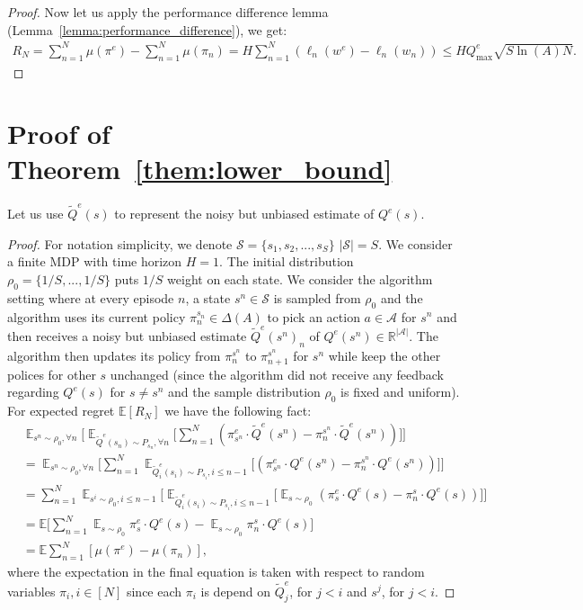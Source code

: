 \documentclass{article}
\begin{document}
\begin{proof}
Now let us apply the performance difference lemma (Lemma~\ref{lemma:performance_difference}), we get:
\begin{align}
R_N = \sum_{n=1}^N\mu(\pi^e) - \sum_{n=1}^N\mu(\pi_n) = H\sum_{n=1}^N (\ell_n(w^e) - \ell_n(w_n)) \leq HQ_{\max}^e\sqrt{S\ln(A)N}.
\end{align}

\end{proof}


\section{Proof of Theorem~\ref{them:lower_bound}}
\label{sec:proof_lower_bound}
Let us use $\tilde{Q}^e(s)$ to represent the noisy but unbiased estimate of $Q^e(s)$.
\begin{proof}
For notation simplicity, we denote $\mathcal{S} = \{s_1, s_2, ..., s_S\}$ $|\mathcal{S}|= S$. We consider a finite MDP with time horizon $H = 1$. The initial distribution $\rho_0 = \{1/S, ..., 1/S\}$ puts $1/S$ weight on each state. 
We consider the algorithm setting where at every episode $n$, a state $s^n\in \mathcal{S}$ is sampled from $\rho_0$ and the algorithm uses its current policy $\pi_{n}^{s_n}\in\Delta({A})$ to pick an action $a\in\mathcal{A}$ for $s^n$ and then receives a noisy but unbiased estimate $\tilde{Q}^e(s^n)_n$ of $Q^e(s^n)\in\mathbb{R}^{|\mathcal{A}|}$. The algorithm then updates its policy from $\pi_{n}^{s^n}$ to $\pi_{n+1}^{s^n}$ for $s^n$ while keep the other polices for other $s$ unchanged (since the algorithm did not receive any feedback regarding $Q^e(s)$ for $s\neq s^{n}$ and the sample distribution $\rho_0$ is fixed and uniform). For expected regret $\mathbb{E}[R_N]$ we have the following fact:
\begin{align}
\label{eq:relation}
&\mathop{\mathbb{E}}_{s^n\sim\rho_0,\forall n}\Big[\mathop{\mathbb{E}}_{\tilde{Q}^e(s_n)\sim P_{s_n},\forall n}\big[\sum_{n=1}^N( \pi^e_{s^n} \cdot \tilde{Q}^e(s^n) - \pi_n^{s^n}\cdot \tilde{Q}^e(s^n))\big]\Big] \nonumber\\
&= \mathop{\mathbb{E}}_{s^n\sim \rho_0,\forall n}\Big[\sum_{n=1}^N\mathop{\mathbb{E}}_{\tilde{Q}^e_i(s_i)\sim P_{s_i},i\leq n-1}\big[ (\pi_{s^n}^e\cdot Q^e(s^n) - \pi_n^{s^n}\cdot Q^e(s^n))\big]\Big] \nonumber\\
& = \sum_{n=1}^N\mathop{\mathbb{E}}_{s^i\sim \rho_0,i\leq n-1}\Big[\mathop{\mathbb{E}}_{\tilde{Q}^e_i(s_i)\sim P_{s_i},i\leq n-1}\big[ \mathop{\mathbb{E}}_{s\sim\rho_0}(\pi_{s}^e\cdot Q^e(s) - \pi_n^{s}\cdot Q^e(s))\big]\Big] \nonumber\\
&= \mathbb{E}\big[\sum_{n=1}^N\mathop{\mathbb{E}}_{s\sim\rho_0}\pi_s^e\cdot Q^e(s) - \mathop{\mathbb{E}}_{s\sim \rho_0}\pi_n^s\cdot Q^e(s)\big] \nonumber\\
& = \mathbb{E}\sum_{n=1}^N [\mu(\pi^e) - \mu(\pi_n)],
\end{align}where the expectation in the final equation is taken with respect to random variables $\pi_i,i\in[N]$ since each $\pi_i$ is depend on $\tilde{Q}^e_j$, for $j< i$ and $s^j$, for $j<i$.  


\end{proof}
\end{document}
